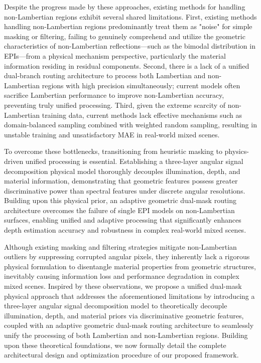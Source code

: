 Despite the progress made by these approaches, existing methods for handling non-Lambertian regions exhibit several shared limitations. First, existing methods handling non-Lambertian regions predominantly treat them as "noise" for simple masking or filtering, failing to genuinely comprehend and utilize the geometric characteristics of non-Lambertian reflections—such as the bimodal distribution in EPIs—from a physical mechanism perspective, particularly the material information residing in residual components. Second, there is a lack of a unified dual-branch routing architecture to process both Lambertian and non-Lambertian regions with high precision simultaneously; current models often sacrifice Lambertian performance to improve non-Lambertian accuracy, preventing truly unified processing. Third, given the extreme scarcity of non-Lambertian training data, current methods lack effective mechanisms such as domain-balanced sampling combined with weighted random sampling, resulting in unstable training and unsatisfactory MAE in real-world mixed scenes.

To overcome these bottlenecks, transitioning from heuristic masking to physics-driven unified processing is essential. Establishing a three-layer angular signal decomposition physical model thoroughly decouples illumination, depth, and material information, demonstrating that geometric features possess greater discriminative power than spectral features under discrete angular resolutions. Building upon this physical prior, an adaptive geometric dual-mask routing architecture overcomes the failure of single EPI models on non-Lambertian surfaces, enabling unified and adaptive processing that significantly enhances depth estimation accuracy and robustness in complex real-world mixed scenes.

Although existing masking and filtering strategies mitigate non-Lambertian outliers by suppressing corrupted angular pixels, they inherently lack a rigorous physical formulation to disentangle material properties from geometric structures, inevitably causing information loss and performance degradation in complex mixed scenes. Inspired by these observations, we propose a unified dual-mask physical approach that addresses the aforementioned limitations by introducing a three-layer angular signal decomposition model to theoretically decouple illumination, depth, and material priors via discriminative geometric features, coupled with an adaptive geometric dual-mask routing architecture to seamlessly unify the processing of both Lambertian and non-Lambertian regions. Building upon these theoretical foundations, we now formally detail the complete architectural design and optimization procedure of our proposed framework.
